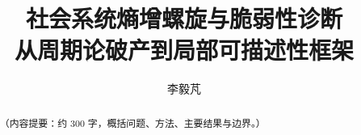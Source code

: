 \documentclass[UTF8,11pt,a4paper,openany]{ctexbook}
\numberwithin{equation}{chapter}      %
\begin{document}
\frontmatter
\title{\sffamily\bfseries 社会系统熵增螺旋与脆弱性诊断\\[6pt]
       \large\normalfont 从周期论破产到局部可描述性框架}
\author{李毅芃}
\maketitle

\begin{abstract}
（内容提要：约 300 字，概括问题、方法、主要结果与边界。）
\end{abstract}

\tableofcontents

\mainmatter
% 

\backmatter

\end{document}

